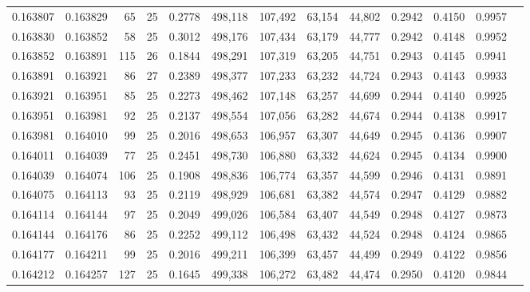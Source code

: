 \begin{tabular}{rrrrrrrrrrrrr}
0.163807 & 0.163829 &    65 &  25 &                                     0.2778 & 498,118 & 107,492 &  63,154 &  44,802 & 0.2942 & 0.4150 & 0.9957 \\
0.163830 & 0.163852 &    58 &  25 &                                     0.3012 & 498,176 & 107,434 &  63,179 &  44,777 & 0.2942 & 0.4148 & 0.9952 \\
0.163852 & 0.163891 &   115 &  26 &                                     0.1844 & 498,291 & 107,319 &  63,205 &  44,751 & 0.2943 & 0.4145 & 0.9941 \\
0.163891 & 0.163921 &    86 &  27 &                                     0.2389 & 498,377 & 107,233 &  63,232 &  44,724 & 0.2943 & 0.4143 & 0.9933 \\
0.163921 & 0.163951 &    85 &  25 &                                     0.2273 & 498,462 & 107,148 &  63,257 &  44,699 & 0.2944 & 0.4140 & 0.9925 \\
0.163951 & 0.163981 &    92 &  25 &                                     0.2137 & 498,554 & 107,056 &  63,282 &  44,674 & 0.2944 & 0.4138 & 0.9917 \\
0.163981 & 0.164010 &    99 &  25 &                                     0.2016 & 498,653 & 106,957 &  63,307 &  44,649 & 0.2945 & 0.4136 & 0.9907 \\
0.164011 & 0.164039 &    77 &  25 &                                     0.2451 & 498,730 & 106,880 &  63,332 &  44,624 & 0.2945 & 0.4134 & 0.9900 \\
0.164039 & 0.164074 &   106 &  25 &                                     0.1908 & 498,836 & 106,774 &  63,357 &  44,599 & 0.2946 & 0.4131 & 0.9891 \\
0.164075 & 0.164113 &    93 &  25 &                                     0.2119 & 498,929 & 106,681 &  63,382 &  44,574 & 0.2947 & 0.4129 & 0.9882 \\
0.164114 & 0.164144 &    97 &  25 &                                     0.2049 & 499,026 & 106,584 &  63,407 &  44,549 & 0.2948 & 0.4127 & 0.9873 \\
0.164144 & 0.164176 &    86 &  25 &                                     0.2252 & 499,112 & 106,498 &  63,432 &  44,524 & 0.2948 & 0.4124 & 0.9865 \\
0.164177 & 0.164211 &    99 &  25 &                                     0.2016 & 499,211 & 106,399 &  63,457 &  44,499 & 0.2949 & 0.4122 & 0.9856 \\
0.164212 & 0.164257 &   127 &  25 &                                     0.1645 & 499,338 & 106,272 &  63,482 &  44,474 & 0.2950 & 0.4120 & 0.9844 \\

\end{tabular}
